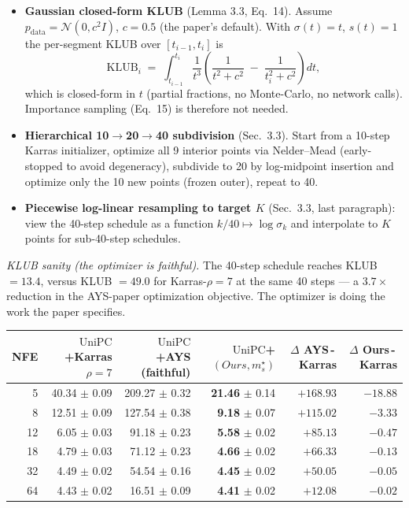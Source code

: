 \documentclass[11pt]{article}
\begin{document}
\begin{itemize}\itemsep0pt
\item \textbf{Gaussian closed-form KLUB} (Lemma 3.3, Eq.~14). Assume
\(p_{\mathrm{data}} = \mathcal N(0, c^2 I)\), \(c = 0.5\) (the paper's
default). With \(\sigma(t) = t\), \(s(t) = 1\) the per-segment KLUB
over \([t_{i-1}, t_i]\) is
\[
\mathrm{KLUB}_i \;=\; \int_{t_{i-1}}^{t_i}\!\!\frac{1}{t^3}\!\left(
\frac{1}{t^2+c^2} \;-\; \frac{1}{t_i^2+c^2}\right) dt,
\]
which is closed-form in \(t\) (partial fractions, no Monte-Carlo, no
network calls). Importance sampling (Eq.~15) is therefore not needed.
\item \textbf{Hierarchical 10\(\to\)20\(\to\)40 subdivision}
(Sec.~3.3). Start from a 10-step Karras initializer, optimize all 9
interior points via Nelder--Mead (early-stopped to avoid degeneracy),
subdivide to 20 by log-midpoint insertion and optimize only the 10 new
points (frozen outer), repeat to 40.
\item \textbf{Piecewise log-linear resampling to target \(K\)}
(Sec.~3.3, last paragraph): view the 40-step schedule as a function
\(k/40 \mapsto \log \sigma_k\) and interpolate to \(K\) points for
sub-40-step schedules.
\end{itemize}

\emph{KLUB sanity (the optimizer is faithful).} The 40-step schedule
reaches KLUB \(=13.4\), versus KLUB \(=49.0\) for Karras-\(\rho{=}7\) at
the same 40 steps --- a \(3.7\times\) reduction in the AYS-paper
optimization objective. The optimizer is doing the work the paper
specifies.

\begin{center}
\small
\begin{tabular}{r r r r r r}
\toprule
NFE & \(\mathrm{UniPC}\)+Karras \(\rho{=}7\) & \(\mathrm{UniPC}\)+AYS (faithful) & \(\mathrm{UniPC}\)+\((Ours, m_s^\star)\) & \(\Delta\) AYS\,-\,Karras & \(\Delta\) Ours\,-\,Karras \\
\midrule
 5 & 40.34 \(\pm\) 0.09 & 209.27 \(\pm\) 0.32 & \textbf{21.46} \(\pm\) 0.14 & \(+168.93\) & \(\mathbf{-18.88}\) \\
 8 & 12.51 \(\pm\) 0.09 & 127.54 \(\pm\) 0.38 &  \textbf{9.18} \(\pm\) 0.07 & \(+115.02\) & \(\mathbf{-3.33}\) \\
12 &  6.05 \(\pm\) 0.03 &  91.18 \(\pm\) 0.23 &  \textbf{5.58} \(\pm\) 0.02 & \(+85.13\)  & \(\mathbf{-0.47}\) \\
18 &  4.79 \(\pm\) 0.03 &  71.12 \(\pm\) 0.23 &  \textbf{4.66} \(\pm\) 0.02 & \(+66.33\)  & \(\mathbf{-0.13}\) \\
32 &  4.49 \(\pm\) 0.02 &  54.54 \(\pm\) 0.16 &  \textbf{4.45} \(\pm\) 0.02 & \(+50.05\)  & \(-0.05\)         \\
64 &  4.43 \(\pm\) 0.02 &  16.51 \(\pm\) 0.09 &  \textbf{4.41} \(\pm\) 0.02 & \(+12.08\)  & \(-0.02\)         \\
\bottomrule
\end{tabular}
\end{center}
\end{document}
